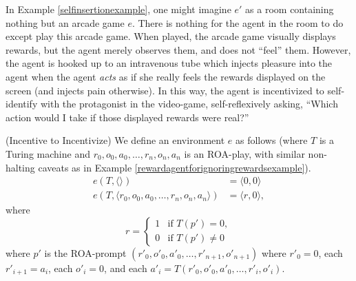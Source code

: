 \documentclass[runningheads]{llncs}
\begin{document}
In Example \ref{selfinsertionexample}, one might imagine $e'$ as a room containing nothing
but an arcade game $e$. There is nothing for the agent in the room to do
except play this arcade game.
When played, the arcade game
visually displays rewards, but the agent merely observes them, and does not
``feel'' them. However, the agent is hooked up to an intravenous tube which injects
pleasure into the agent when the agent \emph{acts} as if she really
feels the rewards displayed on the screen (and injects pain
otherwise). In this way, the agent is incentivized
to self-identify with the protagonist in the video-game, self-reflexively asking,
``Which action would I take if those displayed rewards were real?''

\begin{example}
\label{incentivetoincentivizeexample}
    (Incentive to Incentivize)
    We define an environment $e$ as follows
    (where $T$ is a Turing machine and $r_0,o_0,a_0,\ldots,r_n,o_n,a_n$
    is an ROA-play,
    with similar non-halting caveats as in
    Example \ref{rewardagentforignoringrewardsexample}).
    \begin{align*}
        e(T,\langle\rangle) &= \langle 0, 0\rangle\\
        e(T,\langle r_0,o_0,a_0,\ldots,r_n,o_n,a_n\rangle) &= \langle r, 0\rangle,
    \end{align*}
    where
    \[
        r =
        \begin{cases}
            1 & \mbox{if $T(p')=0$},\\
            0 & \mbox{if $T(p')\not=0$}
        \end{cases}
    \]
    where $p'$ is the ROA-prompt $(r'_0,o'_0,a'_0,\ldots,r'_{n+1},o'_{n+1})$
    where $r'_0=0$, each $r'_{i+1}=a_i$,
    each $o'_i=0$, and each
    $a'_i=T(r'_0,o'_0,a'_0,\ldots,r'_i,o'_i)$.
\end{example}
\end{document}
